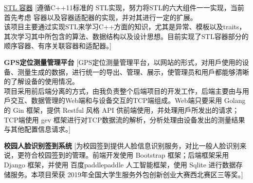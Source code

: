 \documentclass[zh]{resume}
\begin{document}
\begin{experiences}
  {\href{https://github.com/GinShio/STL}{STL 容器}}
  [遵循C++11标准的 STL实现，努力将STL的六大组件一一实现，当前首先考虑 容器以及容器适配器的实现，并对其进行一定的扩展。\\该项目主要通过实现STL来学习C++方面的知识，尤其是异常、模板以及traits，其次学习其中所包含的算法、数据结构以及设计思想。目前实现了STL容器部分的 顺序容器、有序关联容器和适配器。]

  \separator{1.2ex}

  {\textbf{GPS定位测量管理平台}}
  [GPS定位测量管理平台，以网站的形式，对用戶使用的设备、测量生成的数据，进行统一的导出、管理、展示，使管理员和用戶都能够清晰的了解设备的使用情况。\\项目采用前后端分离的方式，由我负责整个后端项目的开发工作，后端主要由与用戶交互、数据管理的Web端和与设备交互的TCP端组成。Web端只要采用 Golang 的 Gin 框架，提供 Restful ⻛格 API 供前端使用，并处理用戶所发出的请求；TCP端使用 gev 框架进行对TCP数据流的解析，分析处理由设备发出的测量结果与其他配置信息请求。]

  \separator{1.2ex}

  {\textbf{校园人脸识别签到系统}}
  [为校园签到提供人脸信息识别服务，对比一般人脸识别来说，更符合校园签到的管理。前端开发使用 Bootstrap 框架；后端框架采用 Django 框架，并使用 百度paddlepaddle 人工智能框架，使用 Sqlite 进行数据存储服务。本项目荣获 2019年全国大学生服务外包创新创业大赛西北赛区三等奖。]
\end{experiences}
\end{document}
